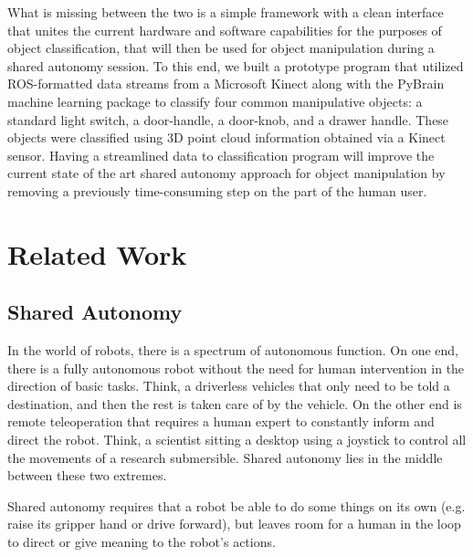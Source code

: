 \documentclass{article}
\begin{document}
What is missing between the two is a simple framework with a clean interface that unites the current hardware and software capabilities for the purposes of object classification, that will then be used for object manipulation during a shared autonomy session. To this end, we built a prototype program that utilized ROS-formatted data streams from a Microsoft Kinect along with the PyBrain machine learning package to classify four common manipulative objects: a standard light switch, a door-handle, a door-knob, and a drawer handle. These objects were classified using 3D point cloud information obtained via a Kinect sensor. Having a streamlined data to classification program will improve the current state of the art shared autonomy approach for object manipulation by removing a previously time-consuming step on the part of the human user.

\section{Related Work}
\subsection{Shared Autonomy}
In the world of robots, there is a spectrum of autonomous function.  On one end, there is a fully autonomous robot
without the need for human intervention in the direction of basic tasks.  Think, a driverless vehicles that only need to be told a destination, and then the rest is taken care of by the vehicle.  On the other end is remote teleoperation that requires a human expert to constantly inform and direct the robot.  Think, a scientist sitting a desktop using a joystick to control all the movements of a research submersible. Shared autonomy lies in the middle between these two extremes. 

Shared autonomy requires that a robot be able to do some things on its own (e.g. raise its gripper hand or drive forward), but leaves
room for a human in the loop to direct or give meaning to the robot's actions.
\end{document}

